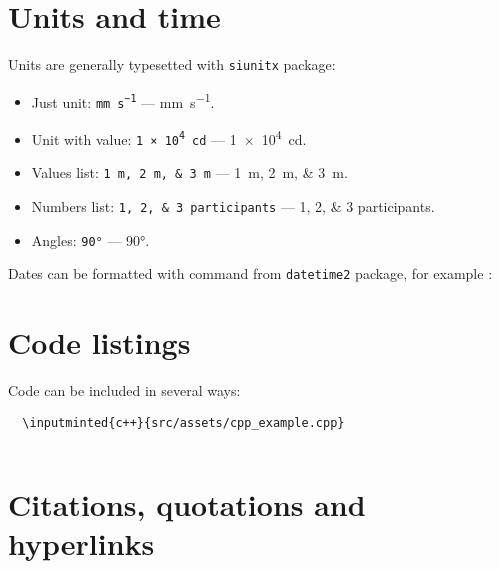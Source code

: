 \section{Units and time}
Units are generally typesetted with \texttt{siunitx} package:
\begin{itemize}
  \item Just unit: \texttt{\si{\milli\meter\per\second}} --- \si{\milli\meter\per\second}.
  \item Unit with value: \texttt{\SI{1e4}{\candela}} --- \SI{1e4}{\candela}.
  \item Values list: \texttt{\SIlist{1;2;3}{\meter}} --- \SIlist{1;2;3}{\meter}.
  \item Numbers list: \texttt{\numlist{1;2;3} participants} --- \numlist{1;2;3} participants.
  \item Angles: \texttt{\ang{90}} --- \ang{90}.
\end{itemize}

Dates can be formatted with \texttt{\DTMDate} command from \texttt{datetime2} package, for example \texttt{}:
\begin{mdframed}[style=example]
\end{mdframed}

\section{Code listings}
Code can be included in several ways:
\begin{verbatim}
  \inputminted{c++}{src/assets/cpp_example.cpp}
\end{verbatim}
\begin{mdframed}[style=example]
  \inputminted{c++}{src/assets/cpp_example.cpp}
\end{mdframed}

\section{Citations, quotations and hyperlinks}
